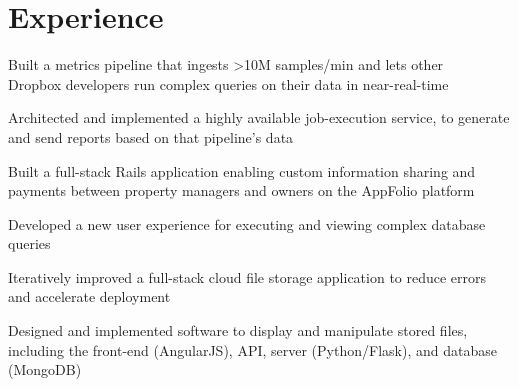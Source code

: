 \section{Experience}

\vspace{\topsep} %
\begin{tightemize}
\item Built a metrics pipeline that ingests >10M samples/min and lets other \\ Dropbox developers run complex queries on their data in near-real-time
\item Architected and implemented a highly available job-execution service, to generate and send reports based on that pipeline's data
\end{tightemize}
\sectionsep

\vspace{\topsep} %
\begin{tightemize}
\item Built a full-stack Rails application enabling custom information sharing and payments between property managers and owners on the AppFolio platform
\item Developed a new user experience for executing and viewing complex database queries
\end{tightemize}
\sectionsep

\begin{tightemize}
\item Iteratively improved a full-stack cloud file storage application to reduce errors and accelerate deployment
\item Designed and implemented software to display and manipulate stored files, including the front-end (AngularJS), API, server (Python/Flask), and database (MongoDB)
\end{tightemize}
\sectionsep
